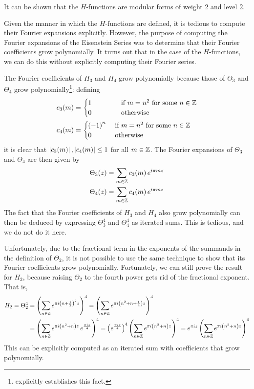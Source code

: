 It can be shown that the $H$-functions are modular forms of weight $2$ and level $2$.

Given the manner in which the $H$-functions are defined, it is tedious to compute their Fourier expansions explicitly. However, the purpose of computing the Fourier expansions of the Eisenstein Series was to determine that their Fourier coefficients grow polynomially. It turns out that in the case of the $H$-functions, we can do this without explicitly computing their Fourier series.

The Fourier coefficients of $H_3$ and $H_4$ grow polynomially because those of $\Theta_3$ and $\Theta_4$ grow polynomially\footnote{ explicitly establishes this fact.}: defining
\begin{align*}
    c_3(m) &=
    \begin{cases}
        1 \quad\quad\quad & \text{ if } m = n^2 \text{ for some } n \in \mathbb{Z} \\
        0 \quad\quad\quad & \text{ otherwise}
    \end{cases} \\
    c_4(m) &=
    \begin{cases}
        \left( -1 \right)^n & \text{ if } m = n^2 \text{ for some } n \in \mathbb{Z} \\
        0 & \text{ otherwise}
    \end{cases}
\end{align*}
it is clear that $\left\lvert c_3(m) \right\rvert, \left\lvert c_4(m) \right\rvert \leq 1$ for all $m \in \mathbb{Z}$. The Fourier expansions of $\Theta_3$ and $\Theta_4$ are then given by
\begin{align*}
    \Theta_{3}\!\left( z \right) &= \sum_{m \in \mathbb{Z}} c_3(m) \, e^{i\pi m z} \\
    \Theta_{4}\!\left( z \right) &= \sum_{m \in \mathbb{Z}} c_4(m) \, e^{i\pi m z}
\end{align*}
The fact that the Fourier coefficients of $H_3$ and $H_4$ also grow polynomially can then be deduced by expressing $\Theta_3^4$ and $\Theta_4^4$ as iterated sums. This is tedious, and we do not do it here.

Unfortunately, due to the fractional term in the exponents of the summands in the definition of $\Theta_2$, it is not possible to use the same technique to show that its Fourier coefficients grow polynomially. Fortunately, we can still prove the result for $H_2$, because raising $\Theta_2$ to the fourth power gets rid of the fractional exponent. That is,
\begin{align*}
    H_2 = \Theta_2^4
    &= \left( \sum_{n \in \mathbb{Z}} e^{\pi i \left( n + \frac{1}{2} \right)^2 z} \right)^4
    = \left( \sum_{n \in \mathbb{Z}} e^{\pi i \left( n^2 + n + \frac{1}{4} \right) z} \right)^4 \\
    &= \left( \sum_{n \in \mathbb{Z}} e^{\pi i \left( n^2 + n \right) z} \, e^{\frac{\pi i z}{4}} \right)^4
    = \left( e^{\frac{\pi i z}{4}} \right)^4  \left( \sum_{n \in \mathbb{Z}} e^{\pi i \left( n^2 + n \right) z} \right)^4
    = e^{\pi i z} \left( \sum_{n \in \mathbb{Z}} e^{\pi i \left( n^2 + n \right) z} \right)^4
\end{align*}
This can be explicitly computed as an iterated sum with coefficients that grow polynomially.

